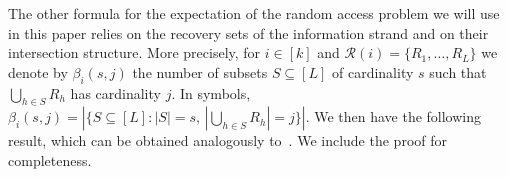 \documentclass[11pt,a4paper,reqno,twoside]{amsart}
\theoremstyle{definition}
\newtheorem{definition}{Definition}
\newtheorem{remark}{Remark}
\newcommand{\F}{\mathbb{F}}
\newcommand{\E}{\mathbb{E}}
\newcommand{\mC}{\mathcal{C}}
\newcommand{\mR}{\mathcal{R}}
\newcommand{\supp}{\operatorname{supp}}
\newcommand{\rcomment}[1]{{\color{red}#1}}
\newcommand{\pcomment}[1]{{\color{purple}#1}}
\newcommand{\vcomment}[1]{{\color{violet}#1}}
\newcommand{\brcomment}[1]{{\color{BrickRed}#1}}
\newcommand{\ag}[1]{{\footnotesize [\brcomment{#1}\;\;\rcomment{--Anina}]}}
\newcommand{\ey}[1]{{{\footnotesize [\pcomment{#1}\;\;\vcomment{--Eitan}]}}}
\begin{document}
The other formula for the expectation of the random access problem we will use in this paper relies on the {recovery sets} of the information strand and on their intersection structure. 
%
%
%
%
%
More precisely, for $i \in [k]$ and $\mR(i)=\{R_1,\dots,R_L\}$ we denote by $\beta_i(s,j)$ the number of subsets
$S \subseteq [L]$ of cardinality $s$ such that $\bigcup_{h \in S} R_h$ has cardinality $j$. In symbols, $\beta_i(s,j) = \left| \{ S \subseteq [L] : |S|=s, \,|\bigcup_{h \in S} R_h | = j  \}  \right|$. We then have the following result, which can be obtained analogously to~\cite[Theorem 8, Corollary 3]{bar2023cover}. We include the proof for completeness.
\end{document}
